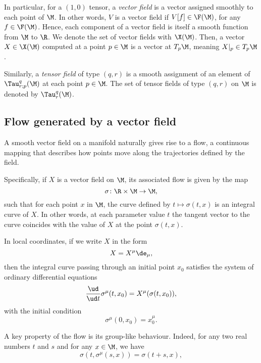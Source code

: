 In particular, for a $(1,0)$ tensor, a \emph{vector field} is a vector assigned smoothly to each point of $\M$. In other words, $V$ is a vector field if $V[f] \in \F(\M)$, for any $f \in \F(\M)$. Hence, each component of a vector field is itself a smooth function from $\M$ to $\R$. We denote the set of vector fields with $\X(\M)$. Then, a vector $X \in \X(\M)$ computed at a point $p \in \M$ is a vector at $T_p \M$, meaning $X|_p \in T_p \M$.

Similarly, a \emph{tensor field} of type $(q,r)$ is a smooth assignment of an element of $\Tau^q_{r;p}(\M)$ at each point $p \in \M$. The set of tensor fields of type $(q,r)$ on $\M$ is denoted by $\Tau^q_r(\M)$.

\subsection{Flow generated by a vector field}
A smooth vector field on a manifold naturally gives rise to a flow, a continuous mapping that describes how points move along the trajectories defined by the field.

Specifically, if $X$ is a vector field on $\M$, its associated flow is given by the map
\begin{equation}
    \sigma \colon \R \times \M \to \M,
\end{equation}
such that for each point $x$ in $\M$, the curve defined by $t \mapsto \sigma(t, x)$ is an integral curve of $X$. In other words, at each parameter value $t$ the tangent vector to the curve coincides with the value of $X$ at the point $\sigma(t,x)$.

In local coordinates, if we write $X$ in the form
\begin{equation}
    X = X^\mu \de_\mu,
\end{equation}
then the integral curve passing through an initial point $x_0$ satisfies the system of ordinary differential equations
\begin{equation}\label{eq:ode-flow-coordinates}
	\frac{\ud}{\ud t} \sigma^\mu (t,x_0) = X^\mu (\sigma(t,x_0)),
\end{equation}
with the initial condition
\begin{equation}\label{eq:ode-flow-initial-condition}
	\sigma^\mu(0,x_0) = x^\mu_0.
\end{equation}

A key property of the flow is its group-like behaviour. Indeed, for any two real numbers $t$ and $s$ and for any $x\in\M$, we have
\begin{equation}\label{eq:property-flow}
	\sigma(t, \sigma^\mu(s,x)) = \sigma(t+s,x),
\end{equation}

